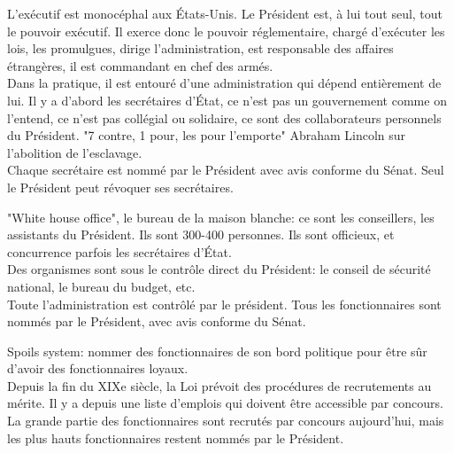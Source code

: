 \documentclass[10pt, a4paper, openany]{book}
\begin{document}
L'exécutif est monocéphal aux États-Unis. Le Président est, à lui tout seul, tout le pouvoir exécutif. Il exerce donc le pouvoir réglementaire, chargé d'exécuter les lois, les promulgues, dirige l'administration, est responsable des affaires étrangères, il est commandant en chef des armés. \\
Dans la pratique, il est entouré d'une administration qui dépend entièrement de lui. Il y a d'abord les secrétaires d'État, ce n'est pas un gouvernement comme on l'entend, ce n'est pas collégial ou solidaire, ce sont des collaborateurs personnels du Président. "7 contre, 1 pour, les pour l'emporte" Abraham Lincoln sur l'abolition de l'esclavage. \\
Chaque secrétaire est nommé par le Président avec avis conforme du Sénat. Seul le Président peut révoquer ses secrétaires. 


"White house office", le bureau de la maison blanche: ce sont les conseillers, les assistants du Président. Ils sont 300-400 personnes. Ils sont officieux, et concurrence parfois les secrétaires d'État. \\
Des organismes sont sous le contrôle direct du Président: le conseil de sécurité national, le bureau du budget, etc. \\
Toute l'administration est contrôlé par le président. Tous les fonctionnaires sont nommés par le Président, avec avis conforme du Sénat. 


Spoils system: nommer des fonctionnaires de son bord politique pour être sûr d'avoir des fonctionnaires loyaux. \\
Depuis la fin du XIXe siècle, la Loi prévoit des procédures de recrutements au mérite. Il y a depuis une liste d'emplois qui doivent être accessible par concours. La grande partie des fonctionnaires sont recrutés par concours aujourd'hui, mais les plus hauts fonctionnaires restent nommés par le Président. 
\end{document}
